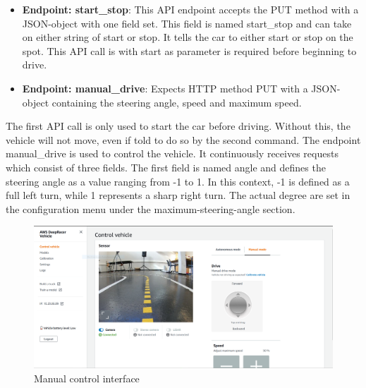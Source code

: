 \begin{itemize}
    \item \textbf{Endpoint: start\_stop}: This API endpoint accepts the PUT method with a JSON-object with one field set. This field is named start\_stop and can take on either string of start or stop. It tells the car to either start or stop on the spot. This API call is with start as parameter is required before beginning to drive.
    \item \textbf{Endpoint: manual\_drive}: Expects HTTP method PUT with a JSON-object containing the steering angle, speed and maximum speed.
\end{itemize}

The first API call is only used to start the car before driving. Without this, the vehicle will not move, even if told to do so by the second command. The endpoint manual\_drive is used to control the vehicle. It continuously receives requests which consist of three fields. The first field is named angle and defines the steering angle as a value ranging from -1 to 1. In this context, -1 is defined as a full left turn, while 1 represents a sharp right turn. The actual degree are set in the configuration menu under the maximum-steering-angle section.


\begin{figure}
    \centering
    \includegraphics[width=.85\textwidth]{images/manual-control.png}
    \caption{Manual control interface}
    \label{fig:manual_control}
\end{figure}

